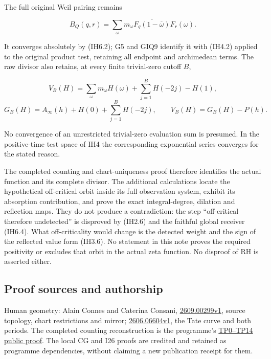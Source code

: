 The full original Weil pairing remains

\[
B_Q(q,r)=\sum_\omega m_\omega
\overline{F_q(1-\overline\omega)}F_r(\omega).
\tag{IH8.1}
\]

It converges absolutely by (IH6.2); G5 and GIQ9 identify it with (IH4.2)
applied to the original product test, retaining all endpoint and
archimedean terms. The raw divisor also retains, at every finite
trivial-zero cutoff \(B\),

\[
V_B(H)=\sum_\omega m_\omega H(\omega)+\sum_{j=1}^BH(-2j)-H(1),
\] \[
G_B(H)=A_\infty(h)+H(0)+\sum_{j=1}^BH(-2j),\qquad
V_B(H)=G_B(H)-P(h).
\tag{IH8.2}
\]

No convergence of an unrestricted trivial-zero evaluation sum is
presumed. In the positive-time test space of IH4 the corresponding
exponential series converges for the stated reason.

The completed counting and chart-uniqueness proof therefore identifies
the actual function and its complete divisor. The additional
calculations locate the hypothetical off-critical orbit inside its full
observation system, exhibit its absorption contribution, and prove the
exact integral-degree, dilation and reflection maps. They do not produce
a contradiction: the step ``off-critical therefore undetected'' is
disproved by (IH2.6) and the faithful global receiver (IH6.4). What
off-criticality would change is the detected weight and the sign of the
reflected value form (IH3.6). No statement in this note proves the
required positivity or excludes that orbit in the actual zeta function.
No disproof of RH is asserted either.

\subsection{Proof sources and
authorship}\label{proof-sources-and-authorship}

Human geometry: Alain Connes and Caterina Consani,
\href{https://arxiv.org/html/2609.00299v1}{2609.00299v1}, source
topology, chart restrictions and mirror;
\href{https://arxiv.org/html/2606.06604v1}{2606.06604v1}, the Tate curve
and both periods. The completed counting reconstruction is the
programme's
\href{https://github.com/KokunoYumeto/zeta-function-research-reader/blob/32acd0df89ae22c96d2bc30372e4426a31ce4506/workbenches/splitzero-tandem/temporary-arguments/20260924-fixed-generic-point-purity/timed-prime-reconstruction/README.md}{TP0--TP14
public proof}. The local CG and I26 proofs are credited and retained as
programme dependencies, without claiming a new publication receipt for
them.

